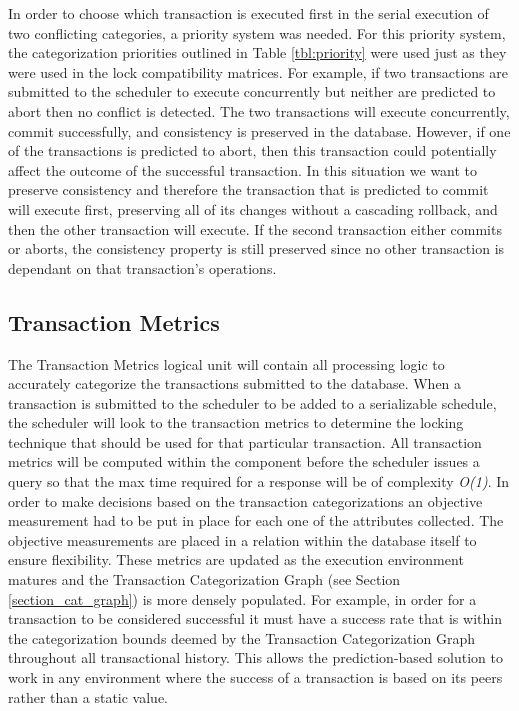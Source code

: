 \documentclass[conference]{IEEEtran}
\begin{document}
In order to choose which transaction is executed first in the serial execution of two conflicting categories, a priority system was needed. For this priority system, the categorization priorities outlined in Table \ref{tbl:priority} were used just as they were used in the lock compatibility matrices. For example, if two transactions are submitted to the scheduler to execute concurrently but neither are predicted to abort then no conflict is detected. The two transactions will execute concurrently, commit successfully, and consistency is preserved in the database. However, if one of the transactions is predicted to abort, then this transaction could potentially affect the outcome of the successful transaction. In this situation we want to preserve consistency and therefore the transaction that is predicted to commit will execute first, preserving all of its changes without a cascading rollback, and then the other transaction will execute. If the second transaction either commits or aborts, the consistency property is still preserved since no other transaction is dependant on that transaction's operations.

\subsection{Transaction Metrics}

The Transaction Metrics logical unit will contain all processing logic to accurately categorize the transactions submitted to the database. When a transaction is submitted to the scheduler to be added to a serializable schedule, the scheduler will look to the transaction metrics to determine the locking technique that should be used for that particular transaction. All transaction metrics will be computed within the component before the scheduler issues a query so that the max time required for a response will be of complexity \textit{O(1)}. In order to make decisions based on the transaction categorizations an objective measurement had to be put in place for each one of the attributes collected. The objective measurements are placed in a relation within the database itself to ensure flexibility. These metrics are updated as the execution environment matures and the Transaction Categorization Graph (see Section \ref{section_cat_graph}) is more densely populated. For example, in order for a transaction to be considered successful it must have a success rate that is within the categorization bounds deemed by the Transaction Categorization Graph throughout all transactional history. This allows the prediction-based solution to work in any environment where the success of a transaction is based on its peers rather than a static value.
\end{document}
